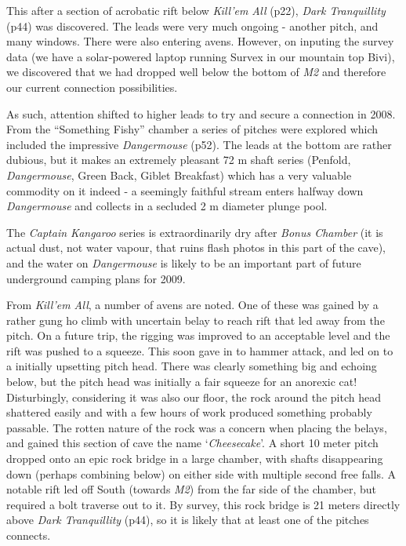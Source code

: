 This after a section of acrobatic rift below \emph{Kill'em All} (p22),
\emph{Dark Tranquillity} (p44) was discovered. The leads were very much
ongoing - another pitch, and many windows. There were also entering
avens. However, on inputing the survey data (we have a solar-powered
laptop running Survex in our mountain top Bivi), we discovered that we
had dropped well below the bottom of \emph{M2} and therefore our current
connection possibilities.

As such, attention shifted to higher leads to try and secure a
connection in 2008. From the ``Something Fishy'' chamber a series of
pitches were explored which included the impressive \emph{Dangermouse}
(p52). The leads at the bottom are rather dubious, but it makes an
extremely pleasant 72 m shaft series (Penfold, \emph{Dangermouse}, Green
Back, Giblet Breakfast) which has a very valuable commodity on it indeed
- a seemingly faithful stream enters halfway down \emph{Dangermouse} and
collects in a secluded 2 m diameter plunge pool.

The \emph{Captain Kangaroo} series is extraordinarily dry after
\emph{Bonus Chamber} (it is actual dust, not water vapour, that ruins
flash photos in this part of the cave), and the water on
\emph{Dangermouse} is likely to be an important part of future
underground camping plans for 2009.

From \emph{Kill'em All}, a number of avens are noted. One of these was
gained by a rather gung ho climb with uncertain belay to reach rift that
led away from the pitch. On a future trip, the rigging was improved to
an acceptable level and the rift was pushed to a squeeze. This soon gave
in to hammer attack, and led on to a initially upsetting pitch head.
There was clearly something big and echoing below, but the pitch head
was initially a fair squeeze for an anorexic cat! Disturbingly,
considering it was also our floor, the rock around the pitch head
shattered easily and with a few hours of work produced something
probably passable. The rotten nature of the rock was a concern when
placing the belays, and gained this section of cave the name
`\emph{Cheesecake}'. A short 10 meter pitch dropped onto an epic rock
bridge in a large chamber, with shafts disappearing down (perhaps
combining below) on either side with multiple second free falls. A
notable rift led off South (towards \emph{M2}) from the far side of the
chamber, but required a bolt traverse out to it. By survey, this rock
bridge is 21 meters directly above \emph{Dark Tranquillity} (p44), so it
is likely that at least one of the pitches connects.


